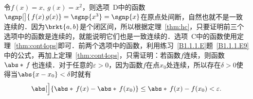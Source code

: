 \begin{enumerate}
  \ifshowsol
  令\(f(x) = x,\ g(x) = x^2\)，则选项~D中的函数\(\sgnp[\big]{\,f(x)\,g(x)} = \sgnp{x^3} = \sgnp{x}\)在原点处间断，自然也就不是一致连续的．因为\(\brkt{a,b}\)是个闭区间，所以根据定理~\ref{thm:hc}，只要证明前三个选项中的函数是连续的，就能说明它们也是一致连续的．选项~C中的函数使用定理~\ref{thm:cont4ops}即可．前两个选项中的函数，利用练习~\ref{B1.1.1.E}题~\ref{B1.1.1.E9}中的公式，再加上定理~\ref{thm:cont4ops}，只需证明：若函数\(f\)连续，则函数\(\abs*{\,f\,}\)也连续．对于任意的\(\varepsilon > 0\)，因为函数\(f\)在点\(x_0\)处连续，所以存在\(\delta > 0\)使得当\(\abs{x-x_0} < \delta\)时就有
  \begin{equation*}
    \abs[\Big]{\abs*{\,f(x)} - \abs*{\,f(x_0)}} \le \abs*{\,f(x) - f(x_0)} < \varepsilon.
  \end{equation*}
  \fi
\end{enumerate}
\fi
